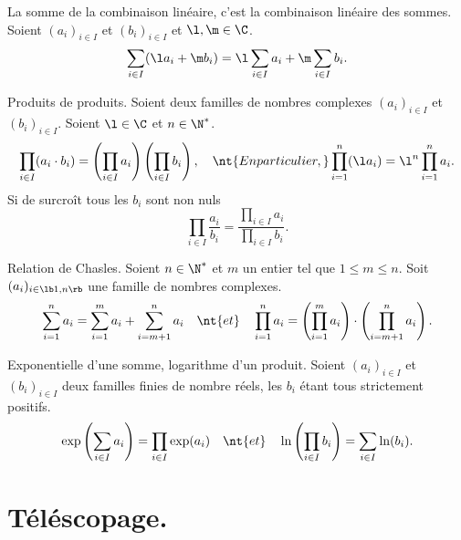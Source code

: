 \documentclass[11pt]{article}
\begin{document}
\begin{corr}{La somme de la combinaison linéaire, c'est la combinaison linéaire des sommes.}{}
    Soient $(a_i)_{i\in I}$ et $(b_i)_{i\in I}$ et $\l,\m\in\C$.
    \begin{equation*}
        \sum_{i\in I}(\l a_i + \m b_i) = \l\sum_{i\in I}a_i + \m\sum_{i\in I}b_i.
    \end{equation*}
\end{corr}

\begin{prop}{Produits de produits.}{}
    Soient deux familles de nombres complexes $(a_i)_{i\in I}$ et $(b_i)_{i\in I}$. Soient $\l\in\C$ et $n\in\N^*$.
    \begin{equation*}
        \prod_{i\in I}(a_i\cdot b_i)=\left( \prod_{i\in I}a_i \right)\left( \prod_{i\in I} b_i \right), \quad \nt{En particulier, } \prod_{i=1}^n(\l a_i)=\l^n\prod_{i=1}^na_i.
    \end{equation*}
    Si de surcroît tous les $b_i$ sont non nuls
    \begin{equation*}
        \prod_{i\in I}\frac{a_i}{b_i}=\frac{\prod_{i\in I}a_i}{\prod_{i\in I}b_i}.
    \end{equation*} 
\end{prop}

\begin{prop}{Relation de Chasles.}{}
    Soient $n\in \N^*$ et $m$ un entier tel que $1\leq m \leq n$. Soit $(a_i)_{i\in\lb1,n\rb}$ une famille de nombres complexes.
    \begin{equation*}
        \sum_{i=1}^na_i=\sum_{i=1}^ma_i+\sum_{i=m+1}^na_i \quad \nt{et} \quad \prod_{i=1}^na_i=\left( \prod_{i=1}^ma_i \right) \cdot \left( \prod_{i=m+1}^{n}a_i \right).
    \end{equation*}
\end{prop}

\begin{prop}{Exponentielle d'une somme, logarithme d'un produit.}{}
    Soient $(a_i)_{i\in I}$ et $(b_i)_{i\in I}$ deux familles finies de nombre réels, les $b_i$ étant tous strictement positifs.
    \begin{equation*}
        \exp\left( \sum_{i\in I}a_i \right)=\prod_{i\in I}\exp(a_i) \quad \nt{et} \quad \ln\left( \prod_{i\in I}b_i \right) = \sum_{i\in I}\ln(b_i).
    \end{equation*}
\end{prop}

\section{Téléscopage.}
\end{document}
